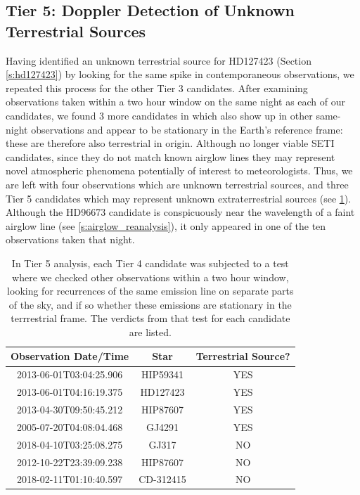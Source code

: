 \documentclass[twocolumn]{aastex701}
\begin{document}
\subsection{Tier 5: Doppler Detection of Unknown Terrestrial Sources}
\label{s:doppler}
Having identified an unknown terrestrial source for HD127423 (Section \ref{s:hd127423}) by looking for the same spike in contemporaneous observations,  we repeated this process for the other Tier 3 candidates.  After examining observations taken within a two hour window on the same night as each of our candidates, we found 3 more candidates in which also show up in other same-night observations and appear to be stationary in the Earth's reference frame: these are therefore also terrestrial in origin.  Although no longer viable SETI candidates, since they do not match known airglow lines they may represent novel atmospheric phenomena potentially of interest to meteorologists. Thus, we are left with four observations which are unknown terrestrial sources, and three Tier 5 candidates which may represent unknown extraterrestrial sources (see \ref{tab:terrestrial_or_extraterrestrial}). Although the HD96673 candidate is conspicuously near the wavelength of a faint airglow line (see \ref{s:airglow_reanalysis}), it only appeared in one of the ten observations taken that night.  

\begin{table}
    \centering
    \begin{tabular}{|c|c|c|}
    \hline
        Observation Date/Time  & Star & Terrestrial Source? \\
    \hline
       2013-06-01T03:04:25.906 & HIP59341 & YES \\
       2013-06-01T04:16:19.375 & HD127423 & YES \\
       2013-04-30T09:50:45.212 & HIP87607 & YES \\
       2005-07-20T04:08:04.468 & GJ4291 & YES \\
       2018-04-10T03:25:08.275 & GJ317 & NO \\
       2012-10-22T23:39:09.238 & HIP87607 & NO \\
       2018-02-11T01:10:40.597 & CD-312415 & NO \\
    \hline
    \end{tabular}
    \caption{In Tier 5 analysis, each Tier 4 candidate was subjected to a test where we checked other observations within a two hour window, looking for recurrences of the same emission line on separate parts of the sky, and if so whether these emissions are stationary in the terrrestrial frame. The verdicts from that test for each candidate are listed.}
    \label{tab:terrestrial_or_extraterrestrial}
\end{table}
\end{document}

